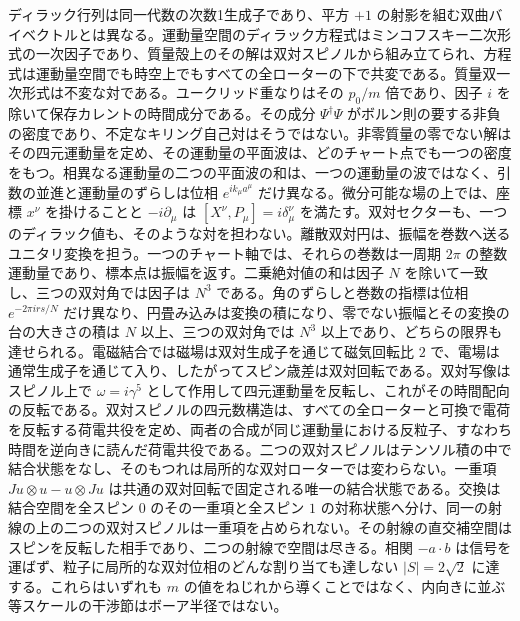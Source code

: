 \documentclass[a4paper]{article}
\begin{document}
ディラック行列は同一代数の次数1生成子であり、平方 $+1$ の射影を組む双曲バイベクトルとは異なる。運動量空間のディラック方程式はミンコフスキー二次形式の一次因子であり、質量殻上のその解は双対スピノルから組み立てられ、方程式は運動量空間でも時空上でもすべての全ローターの下で共変である。質量双一次形式は不変な対である。ユークリッド重なりはその $p_0/m$ 倍であり、因子 $i$ を除いて保存カレントの時間成分である。その成分 $\Psi^\dagger\Psi$ がボルン則の要する非負の密度であり、不定なキリング自己対はそうではない。非零質量の零でない解はその四元運動量を定め、その運動量の平面波は、どのチャート点でも一つの密度をもつ。相異なる運動量の二つの平面波の和は、一つの運動量の波ではなく、引数の並進と運動量のずらしは位相 $e^{ik_\mu a^\mu}$ だけ異なる。微分可能な場の上では、座標 $x^\nu$ を掛けることと $-i\partial_\mu$ は $[X^\nu,P_\mu]=i\delta^\nu_\mu$ を満たす。双対セクターも、一つのディラック値も、そのような対を担わない。離散双対円は、振幅を巻数へ送るユニタリ変換を担う。一つのチャート軸では、それらの巻数は一周期 \(2\pi\) の整数運動量であり、標本点は振幅を返す。二乗絶対値の和は因子 $N$ を除いて一致し、三つの双対角では因子は $N^3$ である。角のずらしと巻数の指標は位相 $e^{-2\pi i rs/N}$ だけ異なり、円畳み込みは変換の積になり、零でない振幅とその変換の台の大きさの積は $N$ 以上、三つの双対角では $N^3$ 以上であり、どちらの限界も達せられる。電磁結合では磁場は双対生成子を通じて磁気回転比 $2$ で、電場は通常生成子を通じて入り、したがってスピン歳差は双対回転である。双対写像はスピノル上で $\omega=i\gamma^5$ として作用して四元運動量を反転し、これがその時間配向の反転である。双対スピノルの四元数構造は、すべての全ローターと可換で電荷を反転する荷電共役を定め、両者の合成が同じ運動量における反粒子、すなわち時間を逆向きに読んだ荷電共役である。二つの双対スピノルはテンソル積の中で結合状態をなし、そのもつれは局所的な双対ローターでは変わらない。一重項 $Ju\otimes u-u\otimes Ju$ は共通の双対回転で固定される唯一の結合状態である。交換は結合空間を全スピン $0$ のその一重項と全スピン $1$ の対称状態へ分け、同一の射線の上の二つの双対スピノルは一重項を占められない。その射線の直交補空間はスピンを反転した相手であり、二つの射線で空間は尽きる。相関 $-a\cdot b$ は信号を運ばず、粒子に局所的な双対位相のどんな割り当ても達しない $|S|=2\sqrt2$ に達する。これらはいずれも $m$ の値をねじれから導くことではなく、内向きに並ぶ等スケールの干渉節はボーア半径ではない。
\end{document}
